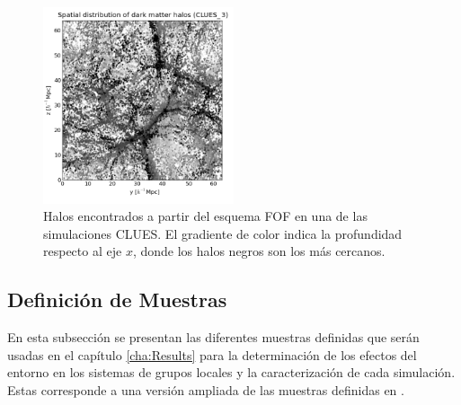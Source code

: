 \begin{figure}[htbp]
	\centering
	\includegraphics[width=0.5\textwidth]
	{./figures/3_nbody_simulations/Halos_Spatial_Distribution(CLUES_16953).png}

	\caption{\small{Halos encontrados a partir del esquema FOF en una de 
	las	simulaciones CLUES. El gradiente de color indica la profundidad 
	respecto al eje $x$, donde los halos negros son los más cercanos.}}
	
	\label{fig:CLUES_FOF}
\end{figure}


	\subsection{Definición de Muestras}
	\label{subsec:SampleOfPairsToUse}
	

En esta subsección se presentan las diferentes muestras definidas que serán 
usadas en el capítulo \ref{cha:Results} para la determinación de los efectos 
del entorno en los sistemas de grupos locales y la caracterización de cada 
simulación. Estas corresponde a una versión ampliada de las muestras 
definidas en \cite{forero2011}.


